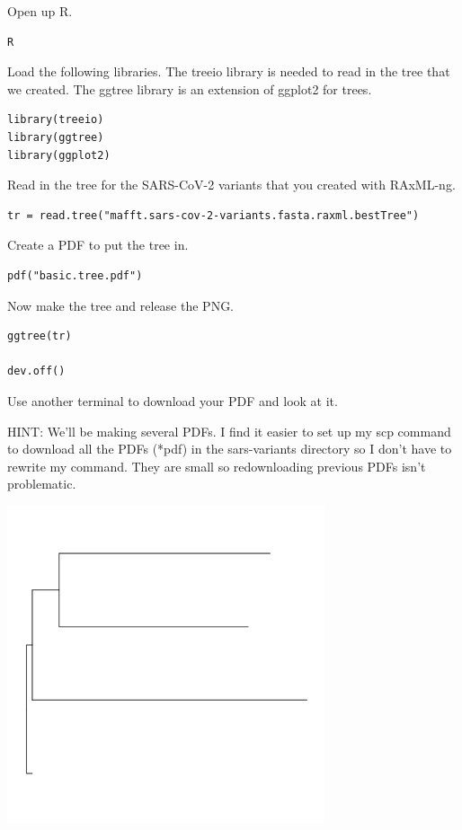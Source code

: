 \documentclass[
]{book}
\begin{document}
\hfill\break

Open up R.

\begin{verbatim}
R
\end{verbatim}

Load the following libraries. The treeio library is needed to read in the tree that we created. The ggtree library is an extension of ggplot2 for trees.

\begin{verbatim}
library(treeio)
library(ggtree)
library(ggplot2)
\end{verbatim}

Read in the tree for the SARS-CoV-2 variants that you created with RAxML-ng.

\begin{verbatim}
tr = read.tree("mafft.sars-cov-2-variants.fasta.raxml.bestTree")
\end{verbatim}

Create a PDF to put the tree in.

\begin{verbatim}
pdf("basic.tree.pdf")
\end{verbatim}

Now make the tree and release the PNG.

\begin{verbatim}
ggtree(tr)

dev.off()
\end{verbatim}

Use another terminal to download your PDF and look at it.

HINT: We'll be making several PDFs. I find it easier to set up my scp command to download all the PDFs (*pdf) in the sars-variants directory so I don't have to rewrite my command. They are small so redownloading previous PDFs isn't problematic.

\includegraphics[width=0.7\textwidth,height=\textheight]{./Figures/basic.tree.png}
\end{document}
